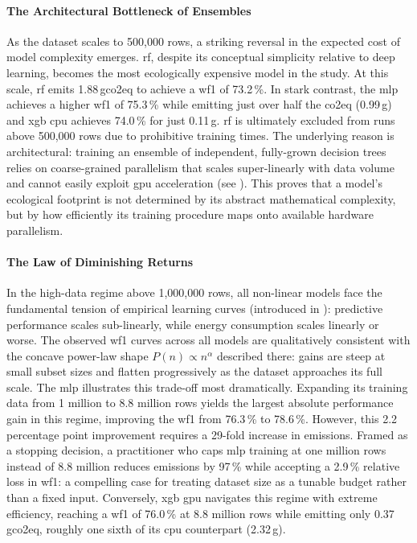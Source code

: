 \FloatBarrier
\paragraph{The Architectural Bottleneck of Ensembles}
As the dataset scales to 500{,}000 rows, a striking reversal in the expected cost of model complexity emerges. \gls{rf}, despite its conceptual simplicity relative to deep learning, becomes the most ecologically expensive model in the study. At this scale, \gls{rf} emits 1.88\,\gls{gco2eq} to achieve a \gls{wf1} of 73.2\,\%. In stark contrast, the \gls{mlp} achieves a higher \gls{wf1} of 75.3\,\% while emitting just over half the \gls{co2eq} (0.99\,g) and \gls{xgb} \gls{cpu} achieves 74.0\,\% for just 0.11\,g. \gls{rf} is ultimately excluded from runs above 500{,}000 rows due to prohibitive training times. The underlying reason is architectural: training an ensemble of independent, fully-grown decision trees relies on coarse-grained parallelism that scales super-linearly with data volume and cannot easily exploit \gls{gpu} acceleration (see ). This proves that a model's ecological footprint is not determined by its abstract mathematical complexity, but by how efficiently its training procedure maps onto available hardware parallelism.

\FloatBarrier
\paragraph{The Law of Diminishing Returns}
In the high-data regime above 1{,}000{,}000 rows, all non-linear models face the fundamental tension of empirical learning curves (introduced in ): predictive performance scales sub-linearly, while energy consumption scales linearly or worse. The observed \gls{wf1} curves across all models are qualitatively consistent with the concave power-law shape $P(n) \propto n^\alpha$ described there: gains are steep at small subset sizes and flatten progressively as the dataset approaches its full scale. The \gls{mlp} illustrates this trade-off most dramatically. Expanding its training data from 1 million to 8.8 million rows yields the largest absolute performance gain in this regime, improving the \gls{wf1} from 76.3\,\% to 78.6\,\%. However, this 2.2 percentage point improvement requires a 29-fold increase in emissions. Framed as a stopping decision, a practitioner who caps \gls{mlp} training at one million rows instead of 8.8 million reduces emissions by 97\,\% while accepting a 2.9\,\% relative loss in \gls{wf1}: a compelling case for treating dataset size as a tunable budget rather than a fixed input. Conversely, \gls{xgb} \gls{gpu} navigates this regime with extreme efficiency, reaching a \gls{wf1} of 76.0\,\% at 8.8 million rows while emitting only 0.37\,\gls{gco2eq}, roughly one sixth of its \gls{cpu} counterpart (2.32\,g).

